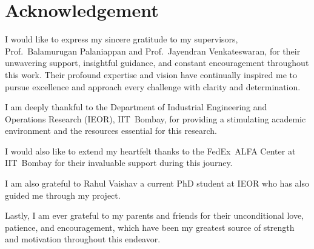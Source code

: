 \chapter*{\Large \center Acknowledgement}
\thispagestyle{empty}

I would like to express my sincere gratitude to my supervisors, Prof.~Balamurugan Palaniappan and Prof.~Jayendran Venkateswaran, for their unwavering support, insightful guidance, and constant encouragement throughout this work. Their profound expertise and vision have continually inspired me to pursue excellence and approach every challenge with clarity and determination.

I am deeply thankful to the Department of Industrial Engineering and Operations Research (IEOR), IIT~Bombay, for providing a stimulating academic environment and the resources essential for this research. 

I would also like to extend my heartfelt thanks to the FedEx~ALFA Center at IIT~Bombay for their invaluable support during this journey.

I am also grateful to Rahul Vaishav a current PhD student at IEOR who has also guided me through my project.

Lastly, I am ever grateful to my parents and friends for their unconditional love, patience, and encouragement, which have been my greatest source of strength and motivation throughout this endeavor.


